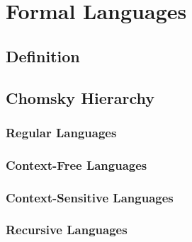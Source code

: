 \chapter{Formal Languages}\label{ch:formal-languages}

\section{Definition}\label{sec:definition}


\section{Chomsky Hierarchy}\label{sec:chromsky-hierarchy}

\subsection{Regular Languages}\label{subsec:regular-languages}

\subsection{Context-Free Languages}\label{subsec:context-free-languages}

\subsection{Context-Sensitive Languages}\label{subsec:context-sensitive-languages}

\subsection{Recursive Languages}\label{subsec:recursive-languages}